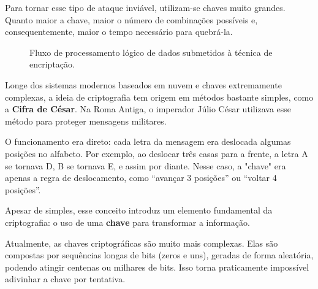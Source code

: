 \documentclass[12pt,a4paper,twoside]{report}
\begin{document}
Para tornar esse tipo de ataque inviável, utilizam-se chaves muito grandes. Quanto maior a chave, maior o número de combinações possíveis e, consequentemente, maior o tempo necessário para quebrá-la.
\begin{figure}[h]
    \centering
    \caption{Fluxo de processamento lógico de dados submetidos à técnica de encriptação.}
    \label{fig:cripto_flow}
\end{figure}
Longe dos sistemas modernos baseados em nuvem e chaves extremamente complexas, a ideia de criptografia tem origem em métodos bastante simples, como a \textbf{Cifra de César}. Na Roma Antiga, o imperador Júlio César utilizava esse método para proteger mensagens militares.

O funcionamento era direto: cada letra da mensagem era deslocada algumas posições no alfabeto. Por exemplo, ao deslocar três casas para a frente, a letra A se tornava D, B se tornava E, e assim por diante. Nesse caso, a "chave" era apenas a regra de deslocamento, como “avançar 3 posições” ou “voltar 4 posições”.

Apesar de simples, esse conceito introduz um elemento fundamental da criptografia: o uso de uma \textbf{chave} para transformar a informação.

Atualmente, as chaves criptográficas são muito mais complexas. Elas são compostas por sequências longas de bits (zeros e uns), geradas de forma aleatória, podendo atingir centenas ou milhares de bits. Isso torna praticamente impossível adivinhar a chave por tentativa.
\end{document}
